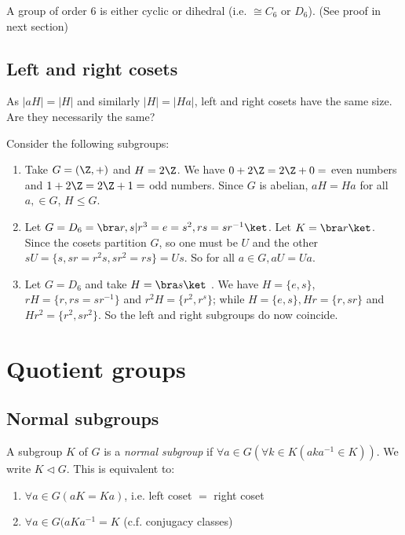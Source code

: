 \documentclass[a4pape]{article}
\begin{document}
\begin{prop}
  A group of order $6$ is either cyclic or dihedral (i.e. $\cong C_6$ or $D_6$). (See proof in next section)
\end{prop}

\subsection{Left and right cosets}
As $|aH| = |H|$  and similarly $|H| = |Ha|$, left and right cosets have the same size. Are they necessarily the same?
\begin{eg}
  Consider the following subgroups:
  \begin{enumerate}
  \item Take $G = (\Z, +)$ and $H = 2\Z$. We have $0 + 2\Z = 2\Z + 0 = $ even numbers and $1 + 2\Z = 2\Z + 1 = $ odd numbers. Since $G$ is abelian, $aH = Ha$ for all $a, \in G$, $H\leq G$.
  \item Let $G = D_6 = \bra r, s | r^3 = e = s^2, rs = sr^{-1}\ket$. Let $K = \bra r\ket$. Since the cosets partition $G$, so one must be $U$ and the other $sU = \{s, sr = r^2s, sr^2 = rs\} = Us$. So for all $a\in G, aU = Ua$. 
  \item Let $G = D_6$ and take $H = \bra s\ket$ . We have $H = \{e, s\}$, $rH = \{r, rs = sr^{-1}\}$ and $r^2 H = \{r^2, r^s\}$; while $H = \{e, s\}, Hr = \{r, sr\}$ and $Hr^2=\{r^2, sr^2\}$. So the left and right subgroups do now coincide.
  \end{enumerate}
\end{eg}

\section{Quotient groups}
\subsection{Normal subgroups}
\begin{defi}
  A subgroup $K$ of $G$ is a \emph{normal subgroup} if $\forall a\in G(\forall k\in K(aka^{-1}\in K))$. We write $K\lhd G$. This is equivalent to:
  \begin{enumerate}
  \item $\forall a\in G(aK = Ka)$, i.e. left coset $=$ right coset
  \item $\forall a\in G(aKa^{-1} = K$ (c.f. conjugacy classes)
  \end{enumerate}
\end{defi}
\end{document}
